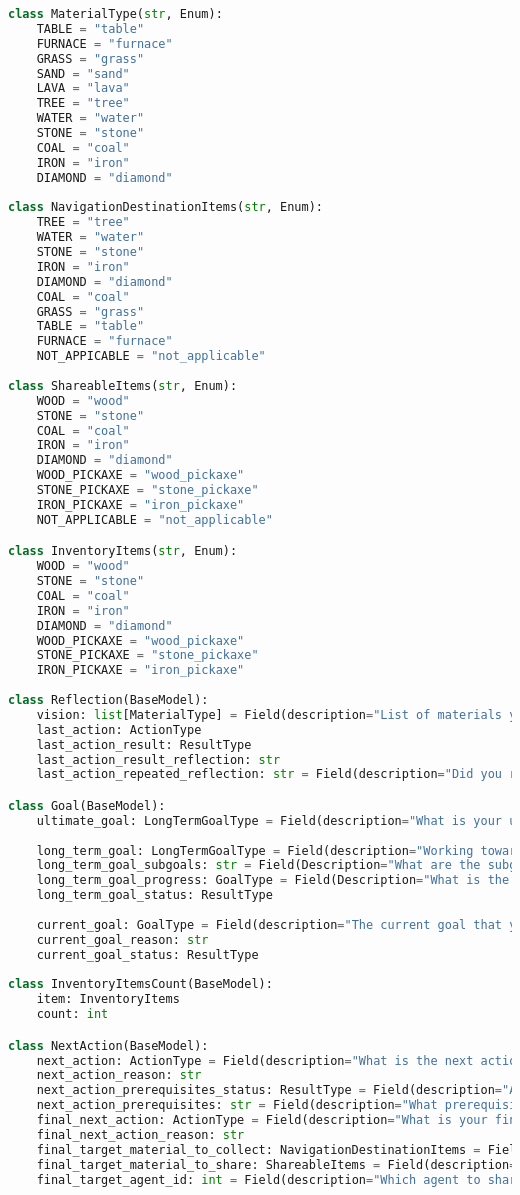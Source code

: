 \begin{lstlisting}[language=Python]
class MaterialType(str, Enum):
    TABLE = "table"
    FURNACE = "furnace"
    GRASS = "grass"
    SAND = "sand"
    LAVA = "lava"
    TREE = "tree"
    WATER = "water"
    STONE = "stone"
    COAL = "coal"
    IRON = "iron"
    DIAMOND = "diamond"
    
class NavigationDestinationItems(str, Enum):
    TREE = "tree"
    WATER = "water"
    STONE = "stone"
    IRON = "iron"
    DIAMOND = "diamond"
    COAL = "coal"
    GRASS = "grass"
    TABLE = "table"
    FURNACE = "furnace"
    NOT_APPICABLE = "not_applicable"
    
class ShareableItems(str, Enum):
    WOOD = "wood"
    STONE = "stone"
    COAL = "coal"
    IRON = "iron"
    DIAMOND = "diamond"
    WOOD_PICKAXE = "wood_pickaxe"
    STONE_PICKAXE = "stone_pickaxe"
    IRON_PICKAXE = "iron_pickaxe"
    NOT_APPLICABLE = "not_applicable"

class InventoryItems(str, Enum):
    WOOD = "wood"
    STONE = "stone"
    COAL = "coal"
    IRON = "iron"
    DIAMOND = "diamond"
    WOOD_PICKAXE = "wood_pickaxe"
    STONE_PICKAXE = "stone_pickaxe"
    IRON_PICKAXE = "iron_pickaxe"
    
class Reflection(BaseModel):
    vision: list[MaterialType] = Field(description="List of materials you see around you.")
    last_action: ActionType 
    last_action_result: ResultType
    last_action_result_reflection: str 
    last_action_repeated_reflection: str = Field(description="Did you repeat the last action? If so, why?")

class Goal(BaseModel):
    ultimate_goal: LongTermGoalType = Field(description="What is your ultimate goal?")
    
    long_term_goal: LongTermGoalType = Field(description="Working towards the ultimate goal, what should be your next goal?")
    long_term_goal_subgoals: str = Field(Description="What are the subgoals to complete the long term goal?")
    long_term_goal_progress: GoalType = Field(Description="What is the progress of the long term goal?")
    long_term_goal_status: ResultType
    
    current_goal: GoalType = Field(description="The current goal that you are working on.")
    current_goal_reason: str 
    current_goal_status: ResultType
 
class InventoryItemsCount(BaseModel):
    item: InventoryItems
    count: int

class NextAction(BaseModel):
    next_action: ActionType = Field(description="What is the next action you plan to take?")
    next_action_reason: str 
    next_action_prerequisites_status: ResultType = Field(description="Are the prerequisites met?")
    next_action_prerequisites: str = Field(description="What prerequisites are not met?")
    final_next_action: ActionType = Field(description="What is your final decision on next action.")
    final_next_action_reason: str 
    final_target_material_to_collect: NavigationDestinationItems = Field(description="Navigate to where?")
    final_target_material_to_share: ShareableItems = Field(description="Share what?")
    final_target_agent_id: int = Field(description="Which agent to share with, if applicable, or return -1.")
    

\end{lstlisting}
